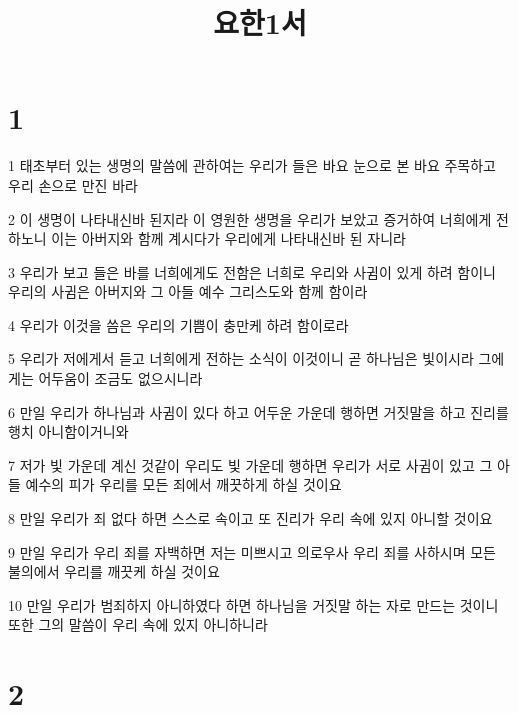 

\title{요한1서}


\chapter{1}

\par 1 태초부터 있는 생명의 말씀에 관하여는 우리가 들은 바요 눈으로 본 바요 주목하고 우리 손으로 만진 바라
\par 2 이 생명이 나타내신바 된지라 이 영원한 생명을 우리가 보았고 증거하여 너희에게 전하노니 이는 아버지와 함께 계시다가 우리에게 나타내신바 된 자니라
\par 3 우리가 보고 들은 바를 너희에게도 전함은 너희로 우리와 사귐이 있게 하려 함이니 우리의 사귐은 아버지와 그 아들 예수 그리스도와 함께 함이라
\par 4 우리가 이것을 씀은 우리의 기쁨이 충만케 하려 함이로라
\par 5 우리가 저에게서 듣고 너희에게 전하는 소식이 이것이니 곧 하나님은 빛이시라 그에게는 어두움이 조금도 없으시니라
\par 6 만일 우리가 하나님과 사귐이 있다 하고 어두운 가운데 행하면 거짓말을 하고 진리를 행치 아니함이거니와
\par 7 저가 빛 가운데 계신 것같이 우리도 빛 가운데 행하면 우리가 서로 사귐이 있고 그 아들 예수의 피가 우리를 모든 죄에서 깨끗하게 하실 것이요
\par 8 만일 우리가 죄 없다 하면 스스로 속이고 또 진리가 우리 속에 있지 아니할 것이요
\par 9 만일 우리가 우리 죄를 자백하면 저는 미쁘시고 의로우사 우리 죄를 사하시며 모든 불의에서 우리를 깨끗케 하실 것이요
\par 10 만일 우리가 범죄하지 아니하였다 하면 하나님을 거짓말 하는 자로 만드는 것이니 또한 그의 말씀이 우리 속에 있지 아니하니라

\chapter{2}

